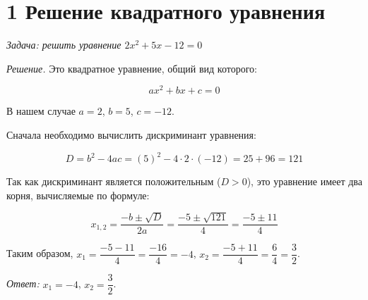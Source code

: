 \documentclass{article}
\begin{document}
\section*{1 Решение квадратного уравнения}

\textit{Задача: решить уравнение $2x^2 + 5x - 12 = 0$}

\textit{Решение.} Это квадратное уравнение, общий вид которого:

\[
ax^2 + bx + c = 0
\]

В нашем случае $a = 2$, $b = 5$, $c = -12$.

Сначала необходимо вычислить дискриминант уравнения:

\[
D = b^2 - 4ac = (5)^2 - 4 \cdot 2 \cdot (-12) = 25 + 96 = 121
\]

Так как дискриминант является положительным ($D > 0$), это уравнение имеет два корня, вычисляемые по формуле:

\[
x_{1,2} = \frac{-b \pm \sqrt{D}}{2a} = \frac{-5 \pm \sqrt{121}}{4} = \frac{-5 \pm 11}{4}
\]

Таким образом, $x_1 = \dfrac{-5 - 11}{4} = \dfrac{-16}{4} = -4$, $x_2 = \dfrac{-5 + 11}{4} = \dfrac{6}{4} = \dfrac{3}{2}$.

\hspace{5mm} \textit{Ответ:} $x_1 = -4$, $x_2 = \dfrac{3}{2}$.
\end{document}
